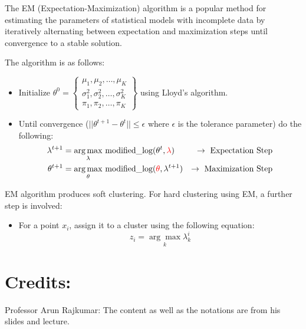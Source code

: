 \documentclass[
]{article}
\providecommand{\tightlist}{%
  \setlength{\itemsep}{0pt}\setlength{\parskip}{0pt}}
\begin{document}
The EM (Expectation-Maximization) algorithm is a popular method for
estimating the parameters of statistical models with incomplete data by
iteratively alternating between expectation and maximization steps until
convergence to a stable solution.

The algorithm is as follows:

\begin{itemize}
\tightlist
\item
  Initialize
  \(\theta^0 = \left \{ \begin{array}{cccc} \mu_1, \mu_2, \ldots, \mu_K \\ \sigma^2_1, \sigma^2_2, \ldots, \sigma^2_K\\ \pi_1, \pi_2, \ldots, \pi_K \end{array} \right \}\)
  using Lloyd's algorithm.
\item
  Until convergence (\(||\theta^{t+1}-\theta^{t} || \le \epsilon\) where
  \(\epsilon\) is the tolerance parameter) do the following:
  \begin{align*}
  \lambda^{t+1} &= \underset{\lambda}{\arg \max} \text{ modified\_log}(\theta^t, \textcolor{red}{\lambda}) &\rightarrow \text{ Expectation Step}\\
  \theta^{t+1} &= \underset{\theta}{\arg \max} \text{ modified\_log}(\textcolor{red}{\theta}, \lambda^{t+1}) &\rightarrow \text{ Maximization Step}\\
  \end{align*}
\end{itemize}

EM algorithm produces soft clustering. For hard clustering using EM, a
further step is involved:

\begin{itemize}
\tightlist
\item
  For a point \(x_i\), assign it to a cluster using the following
  equation: \[
  z_i = \underset{k}{\arg\max} \lambda_k^i
  \]
\end{itemize}

\hypertarget{credits}{%
\section{Credits:}\label{credits}}

Professor Arun Rajkumar: The content as well as the notations are from
his slides and lecture.
\end{document}
